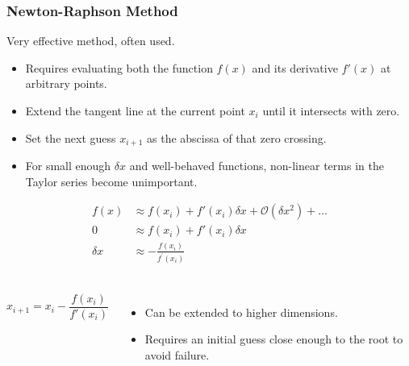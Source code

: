 \begin{frame}[fragile]
    \frametitle{Newton-Raphson Method}
    Very effective method, often used.
    \begin{itemize}
        \item Requires evaluating both the function \( f(x) \) and its derivative \( f'(x) \) at arbitrary points.
        \item Extend the tangent line at the current point \( x_i \) until it intersects with zero.
        \item Set the next guess \( x_{i+1} \) as the abscissa of that zero crossing.
        \item For small enough \( \delta x \) and well-behaved functions, non-linear terms in the Taylor series become unimportant.
    \end{itemize}
    \vspace{-0.10cm}
    \begin{align*}
    f(x) &\approx f(x_i) + f'(x_i)\delta x + \mathcal{O}(\delta x^2) + \dots \\
    0 &\approx f(x_i) + f'(x_i)\delta x \\
    \delta x &\approx -\frac{f(x_i)}{f^\prime (x_i)} \\
    \end{align*}

    \vspace{-1.2cm}
    \begin{columns}
    \[
      \boxed{x_{i+1} = x_i - \frac{f(x_i)}{f'(x_i)}}
      \]   
    \begin{itemize}
        \item Can be extended to higher dimensions.
        \item Requires an initial guess close enough to the root to avoid failure.
    \end{itemize}
  \end{columns}
    
\end{frame}


